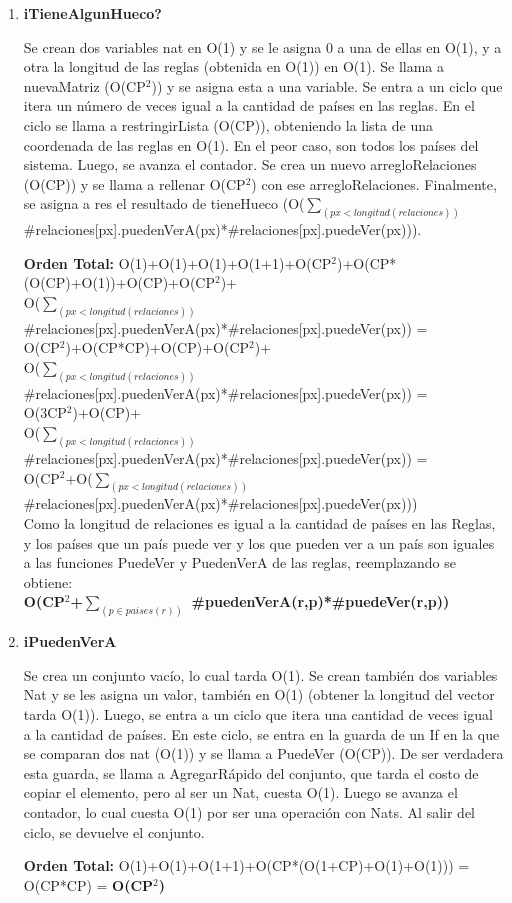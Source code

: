 \begin{enumerate}
\item\textbf{iTieneAlgunHueco?}
\par Se crean dos variables nat en O(1) y se le asigna 0 a una de ellas en O(1), y a otra la longitud de las reglas (obtenida en O(1)) en O(1). Se llama a nuevaMatriz (O(CP$^2$)) y se asigna esta a una variable. Se entra a un ciclo que itera un número de veces igual a la cantidad de países en las reglas. En el ciclo se llama a restringirLista (O(CP)), obteniendo la lista de una coordenada de las reglas en O(1). En el peor caso, son todos los países del sistema. Luego, se avanza el contador. Se crea un nuevo arregloRelaciones (O(CP)) y se llama a rellenar O(CP$^2$) con ese arregloRelaciones. Finalmente, se asigna a res el resultado de tieneHueco (O($\sum_{(px < longitud (relaciones))}$  \#relaciones[px].puedenVerA(px)*\#relaciones[px].puedeVer(px))).
\par\textbf{Orden Total:} O(1)+O(1)+O(1)+O(1+1)+O(CP$^2$)+O(CP*(O(CP)+O(1))+O(CP)+O(CP$^2$)+\\
O($\sum_{(px < longitud (relaciones))}$ \#relaciones[px].puedenVerA(px)*\#relaciones[px].puedeVer(px)) = \\
O(CP$^2$)+O(CP*CP)+O(CP)+O(CP$^2$)+\\
O($\sum_{(px < longitud (relaciones))}$ \#relaciones[px].puedenVerA(px)*\#relaciones[px].puedeVer(px)) = \\
O(3CP$^2$)+O(CP)+\\
O($\sum_{(px < longitud (relaciones))}$ \#relaciones[px].puedenVerA(px)*\#relaciones[px].puedeVer(px)) =  \\
O(CP$^2$+O($\sum_{(px<longitud(relaciones))}$ \#relaciones[px].puedenVerA(px)*\#relaciones[px].puedeVer(px)))\\
Como la longitud de relaciones es igual a la cantidad de países en las Reglas, y los países que un país puede ver y los que pueden ver a un país son iguales a las funciones PuedeVer y PuedenVerA de las reglas, reemplazando se obtiene: \\
\textbf{O(CP$^2$+$\sum_{(p \in paises(r))}$ \#puedenVerA(r,p)*\#puedeVer(r,p))}

\item\textbf{iPuedenVerA}
\par Se crea un conjunto vacío, lo cual tarda O(1). Se crean también dos variables Nat y se les asigna un valor, también en O(1) (obtener la longitud del vector tarda O(1)). Luego, se entra a un ciclo que itera una cantidad de veces igual a la cantidad de países. En este ciclo, se entra en la guarda de un If en la que se comparan dos nat (O(1)) y se llama a PuedeVer (O(CP)). De ser verdadera esta guarda, se llama a AgregarRápido del conjunto, que tarda el costo de copiar el elemento, pero al ser un Nat, cuesta O(1). Luego se avanza el contador, lo cual cuesta O(1) por ser una operación con Nats. Al salir del ciclo, se devuelve el conjunto.
\par\textbf{Orden Total:} O(1)+O(1)+O(1+1)+O(CP*(O(1+CP)+O(1)+O(1))) = O(CP*CP) = \textbf{O(CP$^2$)}


\end{enumerate}
